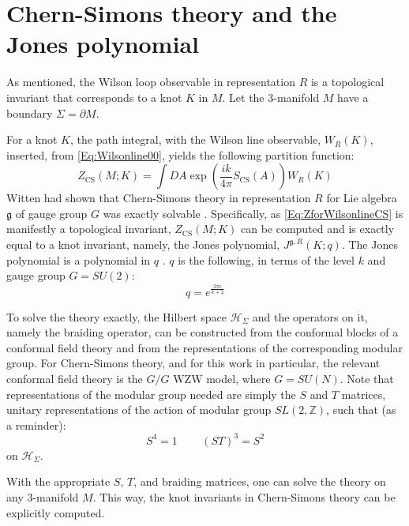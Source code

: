 \documentclass[a4paper,titlepage,twoside]{book}
\begin{document}
\section{Chern-Simons theory and the Jones polynomial }\label{Sec:CStheoryJonespoly}

As mentioned, the Wilson loop observable in representation $R$ is a topological invariant that corresponds to a knot $K$ in $M$.  Let the 3-manifold $M$ have a boundary $\Sigma = \partial M$.

For a knot $K$, the path integral, with the Wilson line observable, $W_R{(K)}$, inserted, from \eqref{Eq:Wilsonline00}, yields the following partition function:
\begin{equation}
  Z_{\text{CS}}{ (M; K)} = \int DA \exp{ \left( \frac{ik}{4\pi } S_{\text{CS}}{ (A)} \right)} W_R{(K)}  \label{Eq:ZforWilsonlineCS}
\end{equation}
Witten had shown that Chern-Simons theory in representation $R$ for Lie algebra $\mathfrak{g}$ of gauge group $G$ was exactly solvable \cite{Witten1989}.  Specifically, as \eqref{Eq:ZforWilsonlineCS} is manifestly a topological invariant, $Z_{\text{CS}}{(M;K)}$ can be computed and is exactly equal to a knot invariant, namely, the Jones polynomial,  $J^{\mathfrak{g},R}{ (K;q)}$.  The Jones polynomial is a polynomial in $q$ \cite{Witten1989}. $q$ is the following, in terms of the level $k$ and gauge group $G=SU(2)$:
\[
q = e^{  \frac{ 2\pi i }{ k + 2 }}
\]


To solve the theory exactly, the Hilbert space $\mathcal{H}_{\Sigma}$ and the operators on it, namely the braiding operator, can be constructed from the conformal blocks of a conformal field theory and from the representations of the corresponding modular group.  For Chern-Simons theory, and for this work in particular, the relevant conformal field theory is the $G/G$ WZW model, where $G=SU(N)$.  Note that representations of the modular group needed are simply the $S$ and $T$ matrices, unitary representations of the action of modular group $SL(2,\mathbb{Z})$, such that (as a reminder):
\begin{equation}
S^4=1 \quad \quad \, (ST)^3 = S^2
\end{equation}
on $\mathcal{H}_{\Sigma}$.

With the appropriate $S$, $T$, and braiding matrices, one can solve the theory on any 3-manifold $M$.  This way, the knot invariants in Chern-Simons theory can be explicitly computed.
\end{document}
